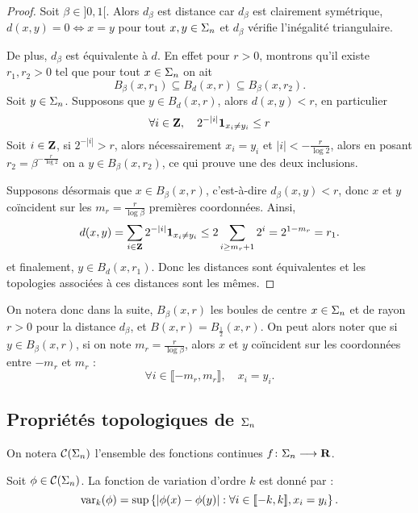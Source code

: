  \begin{proof}
    Soit $\beta \in ]0, 1[$. Alors $d_{\beta}$ est distance car $d_{\beta}$ est clairement symétrique, $d(x, y) = 0 \iff x = y$ pour tout $x,y\in\Sigma_n$
    et $d_{\beta}$ vérifie l'inégalité triangulaire.

    De plus, $d_{\beta}$ est équivalente à $d$. En effet pour $r > 0$, montrons qu'il existe $r_1, r_2 > 0$ tel que pour tout $x \in \Sigma_n$ on ait
    $$B_{\beta}(x, r_1) \subseteq  B_d(x, r) \subseteq B_{\beta}(x, r_2).$$
    Soit $y \in \Sigma_n$. Supposons que $y \in B_d(x, r)$, alors $d(x, y) < r$, en particulier
    $$\forall i \in \mathbf Z, \hspace{1em}2^{-|i|}\mathbf{1}_{x_i \not= y_i} \leq r$$
    Soit $i \in \mathbf Z$, si $2^{-|i|} > r$, alors nécessairement $x_i = y_i$ et $|i| < -\frac{r}{\log{2}}$,
    alors en posant $r_2 = \beta^{-\frac{r}{\log{2}}}$ on a $y \in B_{\beta}(x, r_2)$, ce qui prouve une des deux inclusions.

    Supposons désormais que $x \in B_{\beta}(x, r)$, c'est-à-dire $d_{\beta}(x, y) < r$,
    donc $x$ et $y$ coïncident sur les $m_r = \frac{r}{\log{\beta}}$ premières coordonnées.
    Ainsi,
    $$d(x, y) = \sum_{i\in\mathbf Z}{2^{-|i|}\mathbf{1}_{x_i \not= y_i}} \leq 2\sum_{i \geq m_r + 1}{2^i} = 2^{1 - m_r} = r_1.$$
    et finalement, $y \in B_d(x, r_1)$. Donc les distances sont équivalentes et les topologies associées à ces distances sont les mêmes.
  \end{proof}

  On notera donc dans la suite, $B_{\beta}(x, r)$ les boules de centre $x \in \Sigma_n$ et de rayon $r > 0$ pour la distance $d_{\beta}$,
  et $B(x, r) = B_{\frac 1 2}(x, r)$.
  On peut alors noter que si $y \in B_{\beta}(x, r)$, si on note $m_r = \frac{r}{\log{\beta}}$, alors $x$ et $y$ coïncident sur les coordonnées entre
  $-m_r$ et $m_r$ :
  $$\forall i \in \llbracket -m_r, m_r \rrbracket, \hspace{1em} x_i = y_i.$$

  \subsection{Propriétés topologiques de $\Sigma_n$}

  \begin{definition}
    \label{def:fn_c0}
    On notera $\mathcal{C} (\Sigma_{n})$ l'ensemble des fonctions continues $f \colon \Sigma_n \longrightarrow \mathbf R$.
  \end{definition}

  \begin{definition}
    \label{def:var_potentiel}
    Soit $\phi \in \mathcal{C} (\Sigma_{n})$. La fonction de variation d'ordre $k$ est donné par :
    $$\operatorname{var}_k(\phi) = \sup\left\{|\phi(x) - \phi(y)| : \forall i \in [\![ -k, k]\!], x_i = y_i \right\}.$$
  \end{definition}

